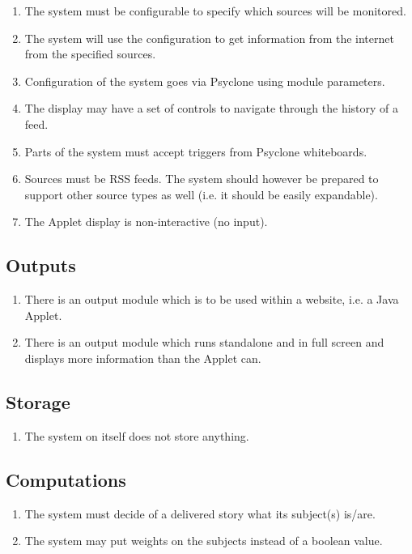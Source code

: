 \begin{enumerate}
  \item The system must be configurable to specify which sources will be
        monitored.
  \item The system will use the configuration to get information from the
        internet from the specified sources.
  \item Configuration of the system goes via Psyclone using module parameters.
  \item The display may have a set of controls to navigate through the history
        of a feed.
  \item Parts of the system must accept triggers from Psyclone whiteboards.
  \item Sources must be \ac{RSS} feeds. The system should however be prepared
        to support other source types as well (i.e. it should be easily
        expandable).
  \item The Applet display is non-interactive (no input).
\end{enumerate}

\subsection{Outputs}

\begin{enumerate}
  \item There is an output module which is to be used within a website,
        i.e. a Java Applet.
  \item There is an output module which runs standalone and in full screen
        and displays more information than the Applet can.
\end{enumerate}

\subsection{Storage}

\begin{enumerate}
  \item The system on itself does not store anything.
\end{enumerate}

\subsection{Computations}

\begin{enumerate}
  \item The system must decide of a delivered story what its subject(s) is/are.
  \item The system may put weights on the subjects instead of a boolean value.
\end{enumerate}

